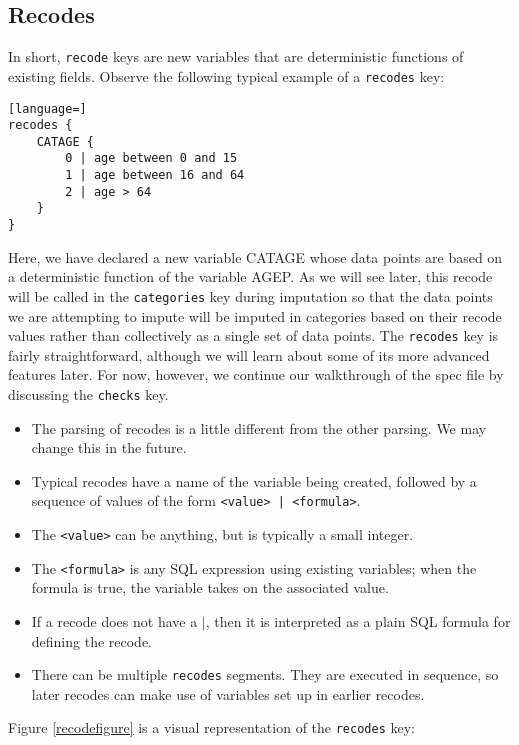 \documentclass{article}
\begin{document}
\subsection{Recodes}
In short, {\tt recode} keys are new variables that are deterministic functions of 
existing fields. Observe the following typical example of a {\tt recodes} key:

\begin{lstlisting}[language=]
recodes {
    CATAGE {
        0 | age between 0 and 15
        1 | age between 16 and 64
        2 | age > 64
    }
}
\end{lstlisting}

Here, we have declared a new variable CATAGE whose data points are based on a 
deterministic function of the variable AGEP. As we will see later, this recode will be called 
in the {\tt categories} key during imputation so that the data points we are attempting to 
impute will be imputed in categories based on their recode values rather than collectively 
as a single set of data points. The {\tt recodes} key is fairly straightforward, although we 
will learn about some of its more advanced features later. For now, however, we continue 
our walkthrough of the spec file by discussing the {\tt checks} key.

\begin{itemize}
\item The parsing of recodes is a little different from the other parsing. We may change
this in the future. 
\item Typical recodes have a name of the variable being created, followed by a sequence of
values of the form {\tt <value> | <formula>}.
\item The {\tt <value>} can be anything, but is typically a small integer.
\item The {\tt <formula>} is any SQL expression using existing variables; when the formula
is true, the variable takes on the associated value.
\item If a recode does not have a $|$, then it is interpreted as a plain SQL formula for
defining the recode.
\item There can be multiple {\tt recodes} segments. They are executed in sequence, so
later recodes can make use of variables set up in earlier recodes.

\end{itemize}

Figure \ref{recodefigure} is a visual representation of the {\tt recodes} key:
\end{document}
